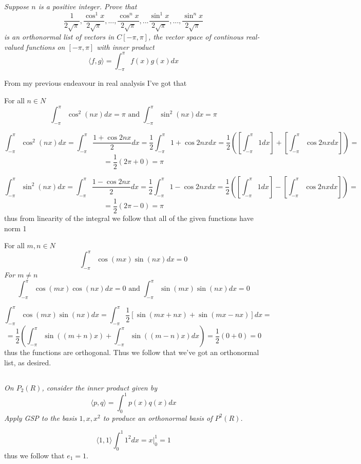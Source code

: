 \documentclass[11pt,oneside,titlepage]{book}
\newcommand{\eangle}[1]{\langle #1 \rangle}
\begin{document}
\textit{Suppose $n$ is a positive integer. Prove that }
$$\frac{1}{2 \sqrt{\pi}}, \frac{\cos^1 x}{2 \sqrt{\pi}}, ..., \frac{\cos^n x}{2 \sqrt{\pi}}, ...
\frac{\sin^1 x}{2 \sqrt{\pi}}, ..., \frac{\sin^n x}{2 \sqrt{\pi}}$$
\textit{is an orthonormal list of vectors in $C[-\pi, \pi]$, the vector space of continous
  real-valued functions on $[-\pi, \pi]$ with inner product}
$$\eangle{f, g} = \int_{-\pi}^\pi{f(x) g(x) dx}$$


From my previous endeavour in real analysis I've got that 

For all $n \in N$
$$\int_{- \pi}^\pi{\cos^2(nx) dx} = \pi \text{ and }\int_{- \pi}^\pi{\sin^2(nx) dx} = \pi$$

$$\int_{- \pi}^\pi{\cos^2(nx) dx} = \int_{- \pi}^\pi{\frac{1 + \cos 2nx}{2} dx}
= \frac 1 2 \int_{- \pi}^\pi{1 + \cos 2nx dx} 
= \frac 1 2 \left(\left[\int_{- \pi}^\pi{1 dx}\right] +
  \left[\int_{- \pi}^\pi{\cos 2nx dx}\right]\right) =$$
$$ =
\frac 1 2 \left(2 \pi + 0\right) = \pi
$$

$$\int_{- \pi}^\pi{\sin^2(nx) dx} = \int_{- \pi}^\pi{\frac{1 - \cos 2nx}{2} dx}
= \frac 1 2 \int_{- \pi}^\pi{1 - \cos 2nx dx} 
= \frac 1 2 \left(\left[\int_{- \pi}^\pi{1 dx}\right] -
  \left[\int_{- \pi}^\pi{\cos 2nx dx}\right]\right) =$$
$$ =
\frac 1 2 \left(2 \pi - 0\right) = \pi
$$
thus from linearity of the integral we follow that all of the given functions have norm 1

For all $m, n \in N$
$$\int_{- \pi}^\pi{\cos(mx) \sin(nx) dx} = 0 $$
\textit{For $m \neq n$}
$$\int_{- \pi}^\pi{\cos(mx) \cos(nx) dx} = 0 \text{ and } \int_{- \pi}^\pi{\sin(mx) \sin(nx) dx} = 0$$

$$\int_{- \pi}^\pi{\cos(mx) \sin(nx) dx} =
\int_{- \pi}^\pi{\frac{1}{2}\left[ \sin(mx + nx) + \sin(mx - nx)\right] dx} =
$$
$$=
\frac{1}{2}\left( \int_{- \pi}^\pi{\sin((m + n)x)} + \int_{- \pi}^\pi{\sin((m - n)x)dx} \right)=
\frac 1 2 (0 + 0) = 0
$$
thus the functions are orthogonal. Thus we follow that we've got an orthonormal list, as desired.


\subsection{}

\textit{On $P_2(R)$, consider the inner product given by}
$$\eangle{p, q} = \int_0^1{p(x) q(x) dx}$$
\textit{Apply GSP to the basis $1, x, x^2$ to produce an orthonormal basis of $P^2(R)$.}

$$\eangle{1, 1}\int_0^1{1^2 dx}  = x|_0^1 = 1$$
thus we follow that $e_1 = 1$.
\end{document}
